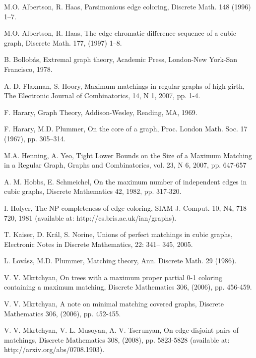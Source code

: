\documentclass[fleqn,12pt,twoside]{article}
\begin{document}
\begin{thebibliography}{99}

 M.O. Albertson, R. Haas, Parsimonious edge
coloring, Discrete Math. 148 (1996) 1--7.

 M.O. Albertson, R. Haas, The edge chromatic
difference sequence of a cubic graph, Discrete Math. 177, (1997)
1--8.

 B. Bollob\'as, Extremal graph theory, Academic Press,
London-New York-San Francisco, 1978.

 A. D. Flaxman, S. Hoory, Maximum matchings in regular
graphs of high girth, The Electronic Journal of Combinatorics, 14, N
1, 2007, pp. 1-4.

 F. Harary, Graph Theory, Addison-Wesley, Reading, MA, 1969.

 F. Harary, M.D. Plummer, On the core of a graph,
Proc. London Math. Soc. 17 (1967), pp. 305--314.

 M.A. Henning, A. Yeo, Tight Lower Bounds on the Size of
a Maximum Matching in a Regular Graph, Graphs and Combinatorics,
vol. 23, N 6, 2007, pp. 647-657

 A. M. Hobbs, E. Schmeichel, On the maximum number of
independent edges in cubic graphs, Discrete Mathematics 42, 1982,
pp. 317-320.

 I. Holyer, The NP-completeness of edge coloring, SIAM J.
Comput. 10, N4, 718-720, 1981 (available at:
http://cs.bris.ac.uk/ian/graphs).

 T. Kaiser, D. Kr\'al, S. Norine, Unions of perfect
matchings in cubic graphs, Electronic Notes in Discrete Mathematics,
22: 341-- 345, 2005.

 L. Lov\'asz, M.D. Plummer, Matching theory, Ann. Discrete Math.
29 (1986).

 V. V. Mkrtchyan, On trees with a maximum proper partial 0-1
coloring containing a maximum matching, Discrete Mathematics 306,
(2006), pp. 456-459.

 V. V. Mkrtchyan, A note on minimal matching covered
graphs, Discrete Mathematics 306, (2006), pp. 452-455.

 V. V. Mkrtchyan, V. L. Musoyan, A. V. Tserunyan, On
edge-disjoint pairs of matchings, Discrete Mathematics 308, (2008),
pp. 5823-5828 (available at: http://arxiv.org/abs/0708.1903).


\end{thebibliography}
\end{document}

